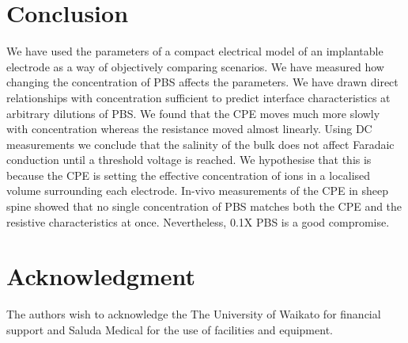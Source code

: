 \documentclass[journal, a4paper]{IEEEtran}
\begin{document}
\section{Conclusion}

We have used the parameters of a compact electrical model of an implantable electrode as a way of objectively comparing scenarios.
We have measured how changing the concentration of PBS affects the parameters.
We have drawn direct relationships with concentration sufficient to predict interface characteristics at arbitrary dilutions of PBS.
We found that the CPE moves much more slowly with concentration whereas the resistance moved almost linearly.
Using DC measurements we conclude that the salinity of the bulk does not affect Faradaic conduction until a threshold voltage is reached. We hypothesise that this is because the CPE is setting the effective concentration of ions in a localised volume surrounding each electrode. In-vivo measurements of the CPE in sheep spine showed that no single concentration of PBS matches both the CPE and the resistive characteristics at once. Nevertheless, 0.1X PBS is a good compromise.

\section*{Acknowledgment}
The authors wish to acknowledge the The University of Waikato for financial support and Saluda Medical for the use of facilities and equipment.
\end{document}
